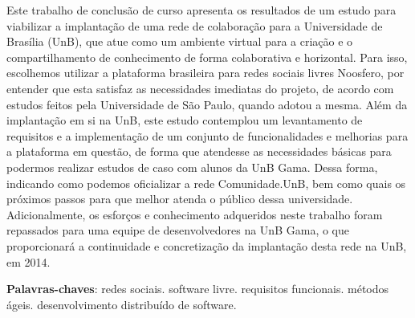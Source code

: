 \begin{resumo}
Este trabalho de conclusão de curso apresenta os resultados de um estudo para
viabilizar a implantação de uma rede de colaboração para a Universidade de
Brasília (UnB), que atue como um ambiente virtual para a criação e o
compartilhamento de conhecimento de forma colaborativa e horizontal.
%
Para isso, escolhemos utilizar a plataforma
brasileira para redes sociais livres Noosfero, por entender que esta satisfaz as
necessidades imediatas do projeto, de acordo com estudos feitos pela
Universidade de São Paulo, quando adotou a mesma.
%
Além da implantação em si na UnB, este estudo contemplou um levantamento de
requisitos e a implementação de um conjunto de funcionalidades e melhorias para a
plataforma em questão, de forma que atendesse as necessidades
básicas para podermos realizar estudos de caso com alunos da UnB Gama.
%
Dessa forma, indicando como podemos oficializar a rede Comunidade.UnB, bem
como quais os próximos passos para que melhor atenda o público dessa universidade.
%
Adicionalmente, os esforços e conhecimento adqueridos neste trabalho foram repassados
para uma equipe de desenvolvedores na UnB Gama, o que proporcionará a continuidade
e concretização da implantação desta rede na UnB, em 2014.

 \vspace{\onelineskip}
    
 \noindent
 \textbf{Palavras-chaves}: redes sociais. software livre. requisitos funcionais. métodos ágeis. desenvolvimento distribuído de software.
\end{resumo}
